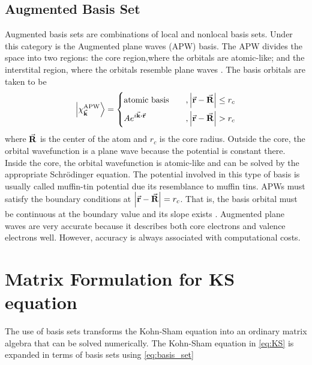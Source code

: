 \subsection{Augmented Basis Set}
Augmented basis sets are combinations of local and nonlocal basis sets. Under this category is the Augmented plane waves (APW) basis. The APW divides the space into two regions: the core region,where the orbitals are atomic-like; and the interstital region, where the orbitals  resemble plane waves \citep{Slater1953}. The basis orbitals are taken to be \citep{Sjoestedt2000}
\begin{equation}
    \ket{\chi^{\text{APW}}_{\va{k}}} = 
    \begin{dcases}
        \text{atomic basis}    \quad &, \abs{\va{r}-\va{R}} \leq r_c \\
        A e^{i \va{k} \vdot \va{r}} &, \abs{\va{r}-\va{R}} > r_c \\
    \end{dcases}
\end{equation}
where $\va{R}$ is the center of the atom and $r_c$ is the core radius. Outside the core, the orbital wavefunction is a plane wave because the potential is constant there. Inside the core, the orbital wavefunction is atomic-like and can be solved by the appropriate Schr\"{o}dinger equation. The potential involved in this type of basis is usually called muffin-tin potential due its resemblance to muffin tins. APWs must satisfy the boundary conditions at $\abs{\va{r}-\va{R}} = r_c$. That is, the basis orbital must be continuous at the boundary value and its slope exists \citep{Andersen1975}. Augmented plane waves are very accurate because it describes both core electrons and valence electrons well. However, accuracy is always associated with computational costs. 



\section{Matrix Formulation for KS equation}
The use of basis sets transforms the Kohn-Sham equation into an ordinary matrix algebra  that can be solved numerically. The Kohn-Sham equation in \eqref{eq:KS} is expanded in terms of basis sets using \eqref{eq:basis_set} 

